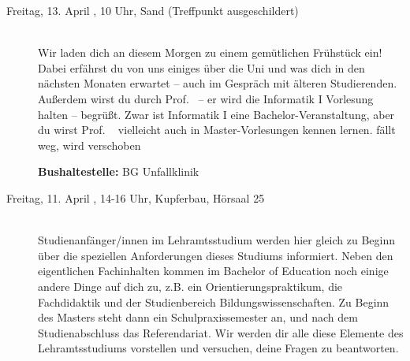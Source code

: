 \begin{description}



\item[Freitag, 13. April \Jahr, 10 Uhr, Sand (Treffpunkt ausgeschildert)]\ \\
   Wir laden dich an diesem Morgen zu einem gemütlichen Frühstück ein! Dabei erfährst du
   von uns einiges über die Uni und was dich in den nächsten Monaten erwartet -- auch im Gespräch mit älteren
   Studierenden. Außerdem wirst du durch Prof. \Infoprof~-- er wird die Informatik I Vorlesung halten -- begrüßt.
   \ifmaster Zwar ist Informatik I eine Bachelor-Veranstaltung, aber du wirst Prof. \Infoprof~ vielleicht auch in Master-Vorlesungen kennen lernen. \fi 
   fällt weg, wird verschoben

   \textbf{Bushaltestelle:} BG Unfallklinik
   
\iflehramt
\item[Freitag, 11. April \Jahr, 14-16 Uhr, Kupferbau, Hörsaal 25]\ \\
Studienanfänger/innen im Lehramtsstudium werden hier gleich zu Beginn über die speziellen 
Anforderungen dieses Studiums informiert. Neben den eigentlichen Fachinhalten kommen im 
Bachelor of Education noch einige andere Dinge auf dich zu, z.B. ein Orientierungspraktikum, die 
Fachdidaktik und der Studienbereich Bildungswissenschaften. Zu Beginn des Masters steht dann 
ein Schulpraxissemester an, und nach dem Studienabschluss das Referendariat. Wir werden dir 
alle diese Elemente des Lehramtsstudiums vorstellen und versuchen, deine Fragen zu beantworten.


\end{description}
